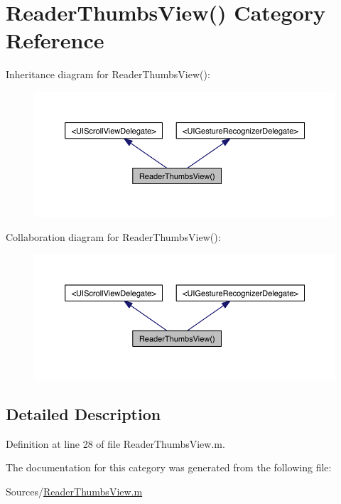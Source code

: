 \hypertarget{category_reader_thumbs_view_07_08}{\section{Reader\-Thumbs\-View() Category Reference}
\label{d3/d02/category_reader_thumbs_view_07_08}
}


Inheritance diagram for Reader\-Thumbs\-View()\-:
\nopagebreak
\begin{figure}[H]
\begin{center}
\leavevmode
\includegraphics[width=350pt]{d1/df2/category_reader_thumbs_view_07_08__inherit__graph}
\end{center}
\end{figure}


Collaboration diagram for Reader\-Thumbs\-View()\-:
\nopagebreak
\begin{figure}[H]
\begin{center}
\leavevmode
\includegraphics[width=350pt]{df/d3f/category_reader_thumbs_view_07_08__coll__graph}
\end{center}
\end{figure}


\subsection{Detailed Description}


Definition at line 28 of file Reader\-Thumbs\-View.\-m.



The documentation for this category was generated from the following file\-:\begin{DoxyCompactItemize}
\item 
Sources/\hyperlink{_reader_thumbs_view_8m}{Reader\-Thumbs\-View.\-m}\end{DoxyCompactItemize}
